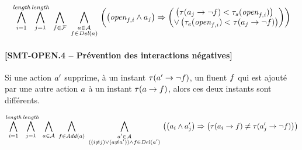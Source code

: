 \begin{small}
\[
\BigforallTwo{i=1}{\length}\BigforallTwo{j=1}{\length}%
~\Bigforall{\substack{\f\in \F}}~\Bigforall{\substack{\a\in \A\\\f \in \del{\a}}}\hfill\\
\left(\left(\open{\f}{i} \wedge \a_{j}\right) \Rightarrow \begin{pmatrix}\left(\tau(\a_{j}\rightarrow \neg \f) < \tau_{s}(\open{\f}{i})\right)\hfill\\
 \vee \left(\tau_{e}(\open{\f}{i}) < \tau(\a_j\rightarrow \neg \f)\right)\end{pmatrix}\right)%
\]
\end{small}


\paragraph*{[SMT-OPEN.4 -- Prévention des interactions négatives]}

Si une action $a'$ supprime, à un instant $\tau(a'\rightarrow\neg f)$, un fluent $f$ qui est ajouté par une autre action $a$ à un instant $\tau(a\rightarrow f)$, alors ces deux instants sont différents.

\begin{small}
\[
\BigforallTwo{i=1}{\length}\BigforallTwo{j=1}{\length}%
~\Bigforall{\substack{\a\in \A}}~\Bigforall{\substack{\f\in \add{\a}}}~\Bigforall{\substack{\b\in \A\\((i \neq j) \vee (\a \neq \b)) \wedge \f \in \del{\b}}}\hfill\\
\left(\left(\a_{i} \wedge \b_{j}\right) \Rightarrow %
\left(\tau(\a_{i}\rightarrow \f) \neq \tau(\b_{j}\rightarrow \neg \f)\right)%
\right)%
\]
\end{small}

